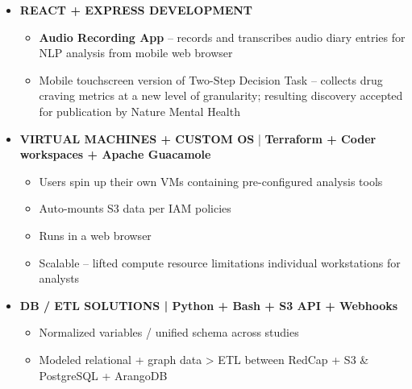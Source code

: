 \documentclass[10pt,a4paper,ragged2e]{altacv}
\begin{document}
\begin{fullwidth}
\begin{itemize}[label={}]
    \item \textbf{REACT + EXPRESS DEVELOPMENT}
        \begin{itemize}[label={-}, noitemsep]
            \item \textbf{Audio Recording App} -- records and transcribes audio diary entries for 
NLP analysis from mobile web browser
        
        \item Mobile touchscreen version of Two-Step Decision Task -- collects drug craving metrics 
at a new level of granularity; resulting discovery accepted for publication by Nature Mental Health
    \end{itemize}
    
    \item \textbf{VIRTUAL MACHINES + CUSTOM OS} | \textbf{Terraform + Coder workspaces + Apache 
Guacamole}
        \begin{itemize}[label={-}, noitemsep]
            \item Users spin up their own VMs containing pre-configured analysis tools
            \item Auto-mounts S3 data per IAM policies
            \item Runs in a web browser
            \item Scalable -- lifted compute resource limitations
individual workstations for analysts 
        \end{itemize}
    \item \textbf{DB / ETL SOLUTIONS | Python + Bash + S3 API + Webhooks} 
        \begin{itemize}[label={-},noitemsep]
            \item Normalized variables / unified schema across studies 
            \item Modeled relational + graph data > ETL between RedCap + S3 \& PostgreSQL + ArangoDB
        \end{itemize}
        

\end{itemize}
\end{fullwidth}
\end{document}
